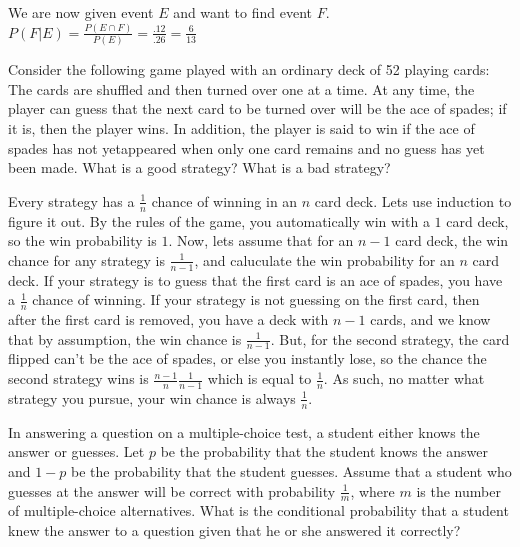\documentclass{article}
\begin{document}
\begin{solution}
We are now given event $E$ and want to find event $F$. $P(F \vert E) = \frac{P(E \cap F)}{P(E)} = \frac{.12}{.26} = \frac{6}{13}$
\end{solution}

\begin{example}[3b]Consider the following game played with an ordinary deck of 52 playing cards: The cards are shuffled and then turned over one at a time. At any time, the player can guess that the next card to be turned over will be the ace of spades; if it is, then the player wins. In addition, the player is said to win if the ace of spades has not yetappeared when only one card remains and no guess has yet been made. What is a good strategy? What is a bad strategy?
\end{example}

\begin{solution}
Every strategy has a $\frac{1}{n}$ chance of winning in an $n$ card deck. Lets use induction to figure it out. By the rules of the game, you automatically win with a $1$ card deck, so the win probability is $1$. Now, lets assume that for an $n-1$ card deck, the win chance for any strategy is $\frac{1}{n-1}$, and caluculate the win probability for an $n$ card deck. If your strategy is to guess that the first card is an ace of spades, you have a $\frac{1}{n}$ chance of winning. If your strategy is not guessing on the first card, then after the first card is removed, you have a deck with $n-1$ cards, and we know that by assumption, the win chance is $\frac{1}{n-1}$. But, for the second strategy, the card flipped can't be the ace of spades, or else you instantly lose, so the chance the second strategy wins is $\frac{n-1}{n} \frac{1}{n-1}$ which is equal to $\frac{1}{n}$. As such, no matter what strategy you pursue, your win chance is always $\frac{1}{n}$.
\end{solution}

\begin{example}[3c]
    In answering a question on a multiple-choice test, a student either knows the answer or guesses. Let $p$ be the probability that the student knows the answer and $1-p$ be the probability that the student guesses. Assume that a student who guesses at the answer will be correct with probability $\frac{1}{m}$, where $m$ is the number of multiple-choice alternatives. What is the conditional probability that a student knew the answer to a question given that he or she answered it correctly?
\end{example}
\end{document}
